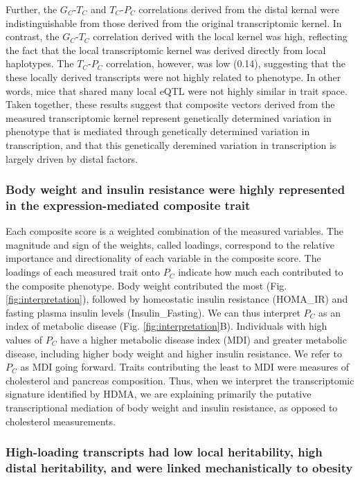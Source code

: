 \documentclass[
]{article}
\begin{document}
Further, the \(G_C\)-\(T_C\) and \(T_C\)-\(P_C\) correlations derived
from the distal kernal were indistinguishable from those derived from
the original transcriptomic kernel. In contrast, the \(G_C\)-\(T_C\)
correlation derived with the local kernel was high, reflecting the fact
that the local transcriptomic kernel was derived directly from local
haplotypes. The \(T_C\)-\(P_C\) correlation, however, was low (0.14),
suggesting that the these locally derived transcripts were not highly
related to phenotype. In other words, mice that shared many local eQTL
were not highly similar in trait space. Taken together, these results
suggest that composite vectors derived from the measured transcriptomic
kernel represent genetically determined variation in phenotype that is
mediated through genetically determined variation in transcription, and
that this genetically deremined variation in transcription is largely
driven by distal factors.

\subsubsection{Body weight and insulin resistance were highly
represented in the expression-mediated composite
trait}\label{body-weight-and-insulin-resistance-were-highly-represented-in-the-expression-mediated-composite-trait}

Each composite score is a weighted combination of the measured
variables. The magnitude and sign of the weights, called loadings,
correspond to the relative importance and directionality of each
variable in the composite score. The loadings of each measured trait
onto \(P_C\) indicate how much each contributed to the composite
phenotype. Body weight contributed the most (Fig.
\ref{fig:interpretation}), followed by homeostatic insulin resistance
(HOMA\_IR) and fasting plasma insulin levels (Insulin\_Fasting). We can
thus interpret \(P_C\) as an index of metabolic disease (Fig.
\ref{fig:interpretation}B). Individuals with high values of \(P_C\) have
a higher metabolic disease index (MDI) and greater metabolic disease,
including higher body weight and higher insulin resistance. We refer to
\(P_C\) as MDI going forward. Traits contributing the least to MDI were
measures of cholesterol and pancreas composition. Thus, when we
interpret the transcriptomic signature identified by HDMA, we are
explaining primarily the putative transcriptional mediation of body
weight and insulin resistance, as opposed to cholesterol measurements.

\subsubsection{High-loading transcripts had low local heritability, high
distal heritability, and were linked mechanistically to
obesity}\label{high-loading-transcripts-had-low-local-heritability-high-distal-heritability-and-were-linked-mechanistically-to-obesity}
\end{document}
